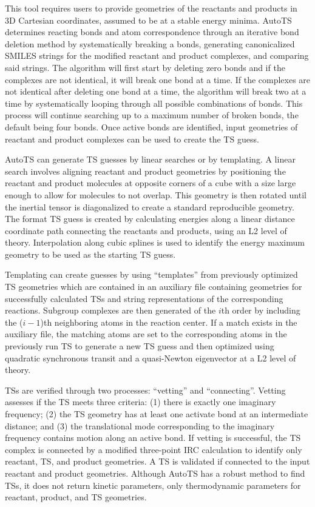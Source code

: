 \documentclass[preprint, 11pt]{elsarticle} %
\begin{document}
This tool requires users to provide geometries of the reactants and products in 3D Cartesian coordinates, assumed to be at a stable energy minima.
AutoTS determines reacting bonds and atom correspondence through an iterative bond deletion method by systematically breaking a bonds, generating canonicalized SMILES strings for the modified reactant and product complexes, and comparing said strings.
The algorithm will first start by deleting zero bonds and if the complexes are not identical, it will break one bond at a time.
If the complexes are not identical after deleting one bond at a time, the algorithm will break two at a time by systematically looping through all possible combinations of bonds.
This process will continue searching up to a maximum number of broken bonds, the default being four bonds.
Once active bonds are identified, input geometries of reactant and product complexes can be used to create the TS guess.

AutoTS can generate TS guesses by linear searches or by templating. 
A linear search involves aligning reactant and product geometries by positioning the reactant and product molecules at opposite corners of a cube with a size large enough to allow for molecules to not overlap.
This geometry is then rotated until the inertial tensor is diagonalized to create a standard reproducible geometry.
The format TS guess is created by calculating energies along a linear distance coordinate path connecting the reactants and products, using an L2 level of theory.
Interpolation along cubic splines is used to identify the energy maximum geometry to be used as the starting TS guess.

Templating can create guesses by using ``templates''  from previously optimized TS geometries which are contained in an auxiliary file containing geometries for successfully calculated TSs and string representations of the corresponding reactions.
Subgroup complexes are then generated of the $i$th order by including the ($i-1$)th neighboring atoms in the reaction center. 
If a match exists in the auxiliary file, the matching atoms are set to the corresponding atoms in the previously run TS to generate a new TS guess and  then optimized using quadratic synchronous transit and a quasi-Newton eigenvector at a L2 level of theory.

TSs are verified through two processes: ``vetting'' and ``connecting''. 
Vetting assesses if the TS meets three criteria: (1) there is exactly one imaginary frequency; (2) the TS geometry has at least one activate bond at an intermediate distance; and (3) the translational mode corresponding to the imaginary frequency contains motion along an active bond.
If vetting is successful, the TS complex is connected by a modified three-point IRC calculation to identify only reactant, TS, and product geometries. 
A TS is validated if connected to the input reactant and product geometries.
Although AutoTS has a robust method to find TSs, it does not return kinetic parameters, only thermodynamic parameters for reactant, product, and TS geometries.
\end{document}

